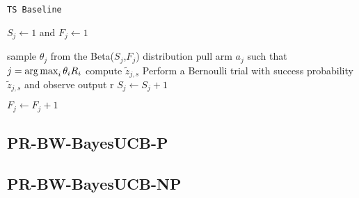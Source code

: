 \begin{algorithm}[H]
	\caption{\texttt{TS Baseline}}
	\begin{scriptsize}
		\begin{algorithmic}[1]
			
			
			
			
			
			 
				\State $S_j \gets 1$ and $F_j \gets 1$
			\EndFor
			
			  
				\State sample $\theta_j$ from the Beta($S_j$,$F_j$) distribution
				\EndFor
			\State pull arm $a_j$ such that $j = \operatorname*{arg\,max}_i \theta_iR_i$
			 
				\State compute $\tilde{z}_{j,s}$
				\State Perform a Bernoulli trial with success probability $\tilde{z}_{j,s}$ and observe output r
				 \;
				\State $S_j \gets S_j + 1$ \;
				
				\Else
				\State $F_j \gets F_j + 1$ \;
				
				\EndIf
				\EndIf		
			\EndFor
			
			\EndFor
			\EndFor
			
			
			\EndFunction
			
		\end{algorithmic}
	\end{scriptsize}
	\label{alg:TSBASELINE}
\end{algorithm}

\subsection{PR-BW-BayesUCB-P}

\subsection{PR-BW-BayesUCB-NP}


























































